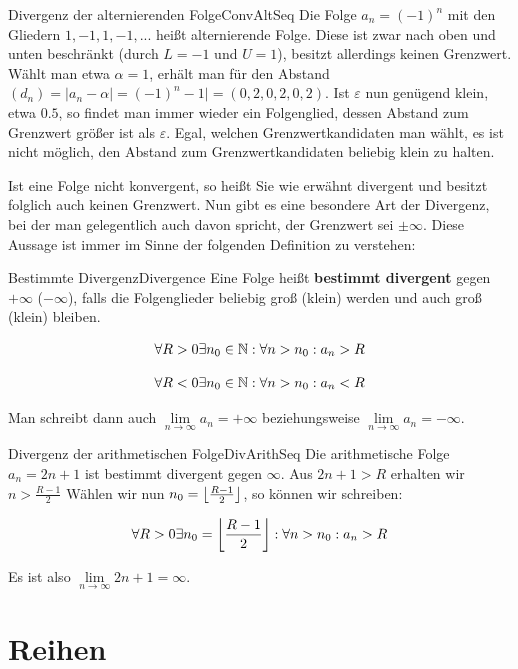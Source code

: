 \begin{example}{Divergenz der alternierenden Folge}{ConvAltSeq}
	Die Folge $a_n = (-1)^n$ mit den Gliedern $1,-1,1,-1,...$ heißt alternierende Folge. Diese ist zwar nach oben und unten beschränkt (durch $L=-1$ und $U=1$), besitzt allerdings keinen Grenzwert. Wählt man etwa $\alpha=1$, erhält man für den Abstand $(d_n) = |a_n-\alpha|=(-1)^n-1| = (0, 2, 0, 2, 0, 2)$. Ist $\varepsilon$ nun genügend klein, etwa $0.5$, so findet man immer wieder ein Folgenglied, dessen Abstand zum Grenzwert größer ist als $\varepsilon$. Egal, welchen Grenzwertkandidaten man wählt, es ist nicht möglich, den Abstand zum Grenzwertkandidaten beliebig klein zu halten.
\end{example}

Ist eine Folge nicht konvergent, so heißt Sie wie erwähnt divergent und besitzt folglich auch keinen Grenzwert. Nun gibt es eine besondere Art der Divergenz, bei der man gelegentlich auch davon spricht, der Grenzwert sei $\pm\infty$. Diese Aussage ist immer im Sinne der folgenden Definition zu verstehen:

\begin{definition}{Bestimmte Divergenz}{Divergence}
	Eine Folge heißt \textbf{bestimmt divergent} gegen $+\infty$ ($-\infty$), falls die Folgenglieder beliebig groß (klein) werden und auch groß (klein) bleiben.

	$$
	\forall R > 0 \exists n_0\in\mathbb{N}: \forall n > n_0 : a_n > R
	$$

	$$
	\forall R < 0 \exists n_0\in\mathbb{N}: \forall n > n_0 : a_n < R
	$$

	Man schreibt dann auch $\lim\limits_{n\to\infty}a_n = +\infty$ beziehungsweise $\lim\limits_{n\to\infty}a_n = -\infty$.
\end{definition}


\begin{example}{Divergenz der arithmetischen Folge}{DivArithSeq}
	Die arithmetische Folge $a_n=2n+1$ ist bestimmt divergent gegen $\infty$. Aus $2n+1 > R$ erhalten wir $n > \frac{R-1}{2}$ Wählen wir nun $n_0 = \left\lfloor \frac{R-1}{2} \right\rfloor$, so können wir schreiben:

	$$
	\forall R > 0 \exists n_0 = \left\lfloor \frac{R-1}{2} \right\rfloor: \forall n > n_0 : a_n > R
	$$

	Es ist also $\lim\limits_{n\to\infty} 2n+1 = \infty$.
\end{example}


\section{Reihen}

